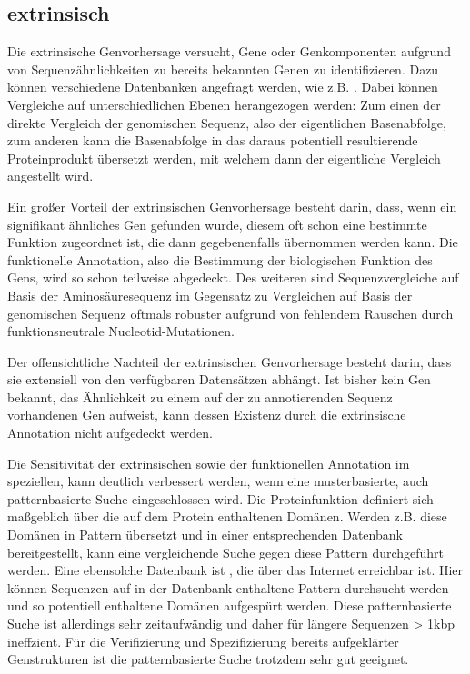 \subsection{extrinsisch }
Die extrinsische Genvorhersage versucht, Gene oder Genkomponenten aufgrund von
Sequenzähnlichkeiten zu bereits bekannten Genen zu identifizieren.
Dazu können verschiedene Datenbanken angefragt werden, wie z.B. .
Dabei können Vergleiche auf unterschiedlichen Ebenen herangezogen werden:
Zum einen der direkte Vergleich der genomischen Sequenz, also der eigentlichen
Basenabfolge, zum anderen kann die Basenabfolge in das daraus potentiell
resultierende Proteinprodukt übersetzt werden, mit welchem dann der eigentliche
Vergleich angestellt wird.

Ein großer Vorteil der extrinsischen Genvorhersage besteht darin, dass, wenn ein
signifikant ähnliches Gen gefunden wurde, diesem oft schon eine bestimmte
Funktion zugeordnet ist, die dann gegebenenfalls übernommen werden kann.
Die funktionelle Annotation, also die Bestimmung der biologischen Funktion des
Gens, wird so schon teilweise abgedeckt.
Des weiteren sind Sequenzvergleiche auf Basis der Aminosäuresequenz im
Gegensatz zu Vergleichen auf Basis der genomischen Sequenz oftmals robuster
aufgrund von fehlendem Rauschen durch funktionsneutrale Nucleotid-Mutationen.

Der offensichtliche Nachteil der extrinsischen Genvorhersage besteht darin, dass
sie extensiell von den verfügbaren Datensätzen abhängt.
Ist bisher kein Gen bekannt, das Ähnlichkeit zu einem auf der zu annotierenden
Sequenz vorhandenen Gen aufweist, kann dessen Existenz durch die extrinsische
Annotation nicht aufgedeckt werden.

Die Sensitivität der extrinsischen sowie der funktionellen Annotation im
speziellen, kann deutlich verbessert werden, wenn eine musterbasierte, auch
patternbasierte Suche eingeschlossen wird.
Die Proteinfunktion definiert sich maßgeblich über die auf dem Protein
enthaltenen Domänen.
Werden z.B. diese Domänen in Pattern übersetzt und in einer entsprechenden
Datenbank bereitgestellt, kann eine vergleichende Suche gegen diese Pattern
durchgeführt werden.
Eine ebensolche Datenbank ist , die über das Internet
erreichbar ist.
Hier können Sequenzen auf in der Datenbank enthaltene Pattern
durchsucht werden und so potentiell enthaltene Domänen aufgespürt werden.
Diese patternbasierte Suche ist allerdings sehr zeitaufwändig und daher für
längere Sequenzen > 1kbp ineffzient.
Für die Verifizierung und Spezifizierung bereits aufgeklärter Genstrukturen ist
die patternbasierte Suche trotzdem sehr gut geeignet.
\citep{pmid16749184}